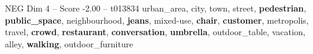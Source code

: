 \begin{textsample}{NEG Dim 4 – Score -2.00 – t013834}  \label{ex:f4_neg_015}
urban\_area, city, town, street, \textbf{pedestrian}, \textbf{public\_space}, neighbourhood, \textbf{jeans}, mixed-use, \textbf{chair}, \textbf{customer}, metropolis, travel, \textbf{crowd}, \textbf{restaurant}, \textbf{conversation}, \textbf{umbrella}, outdoor\_table, vacation, alley, \textbf{walking}, outdoor\_furniture

\end{textsample}
